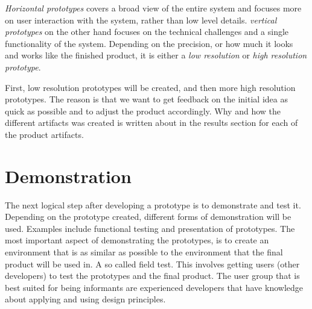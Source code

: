 \documentclass{report}
\begin{document}
\textit{Horizontal prototypes} covers a broad view of the entire system and focuses more on user interaction with the system, rather than low level details. \textit{vertical prototypes} on the other hand focuses on the technical challenges and a single functionality of the system. Depending on the precision, or how much it looks and works like the finished product, it is either a \textit{low resolution} or \textit{high resolution prototype}. 

First, low resolution prototypes will be created, and then more high resolution prototypes. The reason is that we want to get feedback on the initial idea as quick as possible and to adjust the product accordingly. Why and how the different artifacts was created is written about in the results section for each of the product artifacts.
\section{Demonstration}

The next logical step after developing a prototype is to demonstrate and test it. Depending on the prototype created, different forms of demonstration will be used. Examples include functional testing and presentation of prototypes. The most important aspect of demonstrating the prototypes, is to create an environment that is as similar as possible to the environment that the final product will be used in. A so called field test. This involves getting users (other developers) to test the prototypes and the final product. The user group that is best suited for being informants are experienced developers that have knowledge about applying and using design principles.


\end{document}
